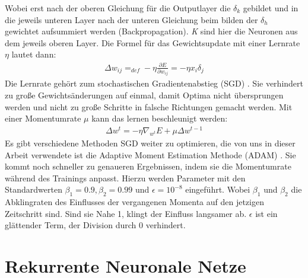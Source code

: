 Wobei erst nach der oberen Gleichung für die Outputlayer die \(\delta_{k}\) gebildet und in die jeweils unteren Layer nach der unteren Gleichung beim bilden der \(\delta_{h}\) gewichtet aufsummiert werden (Backpropagation). \textit{K} sind hier die Neuronen aus dem jeweils oberen Layer. Die Formel für das Gewichtsupdate mit einer Lernrate \(\eta\) lautet dann:
\begin{gather}	
	\Delta w_{ij} =_{def}  -\eta \frac{\partial E}{\partial w_{ij}} = -\eta x_{i}\delta_{j}  
\end{gather} 
Die Lernrate gehört zum stochastischen Gradientenabstieg (SGD) \cite{bib:sgd}. Sie verhindert zu große Gewichtsänderungen auf einmal, damit Optima nicht übersprungen werden und nicht zu große Schritte in falsche Richtungen gemacht werden. Mit einer Momentumrate $ \mu$ kann das lernen beschleunigt werden:
\begin{gather}	
\Delta w^{t} =  -\eta \nabla_{w^{t}}E + \mu \Delta w^{t-1}
\end{gather} 
Es gibt verschiedene Methoden SGD weiter zu optimieren, die von uns in dieser Arbeit verwendete ist die Adaptive Moment Estimation Methode (ADAM) \cite{bib:adam}. Sie kommt noch schneller zu genaueren Ergebnissen, indem sie die Momentumrate während des Trainings anpasst. Hierzu werden Parameter mit den Standardwerten $ \beta_{1}=0.9, \beta_{2}=0.99 $ und $ \epsilon = 10^{-8}$ eingeführt. Wobei $ \beta_{1} $ und $ \beta_{2} $ die Abklingraten des Einflusses der vergangenen Momenta auf den jetzigen Zeitschritt sind. Sind sie Nahe 1, klingt der Einfluss langsamer ab. $ \epsilon$ ist ein glättender Term, der Division durch 0 verhindert.

\section{Rekurrente Neuronale Netze}

